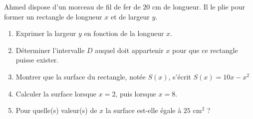\begin{Activite}[][5 min]
Ahmed dispose d'un morceau de fil de fer de $20\text{ cm}$ de longueur.
Il le plie pour former un rectangle de longueur $x$ et de largeur $y$. 
\begin{enumerate}
    \item Exprimer la largeur $y$ en fonction de la longueur $x$.
    \item Déterminer l'intervalle $D$ auquel doit appartenir $x$ pour que ce rectangle puisse exister.
    \item Montrer que la surface du rectangle, notée $S(x)$, s'écrit $S(x) = 10x - x^2$
    \item Calculer la surface lorsque $x = 2$, puis lorsque $x = 8$.
    \item Pour quelle(s) valeur(s) de $x$ la surface est-elle égale à $25\text{ cm}^2$ ?
\end{enumerate}


\end{Activite}
